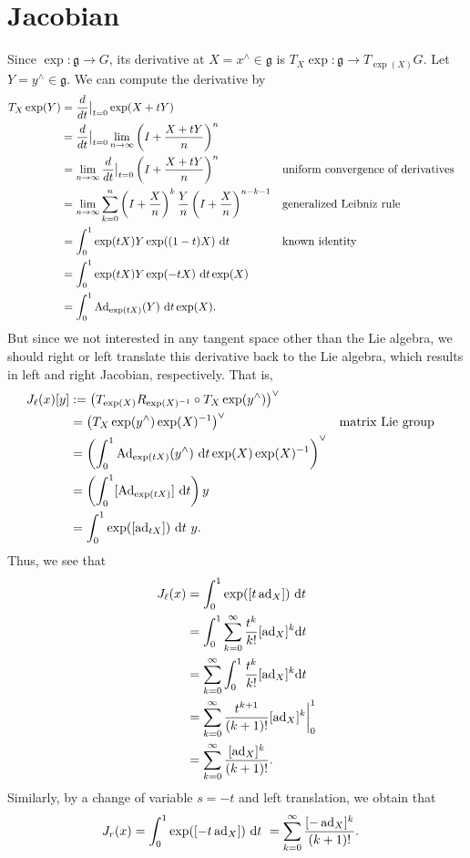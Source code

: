 \documentclass[12pt,class=article,crop=false]{standalone}
\begin{document}
\section{Jacobian}
Since $ \exp: \mathfrak{g} \to G $, its derivative at $ X= x^\wedge  \in \mathfrak{g} $ is $ T_X \exp: \mathfrak{g} \to T_{\exp(X)}G$. Let $ Y= y^\wedge  \in \mathfrak{g} $. We can compute the derivative by
\begin{align*}
	T_X \exp( Y) &= \frac{d}{dt}\big|_{t= 0} \exp( X+tY) \\ 
	&= \frac{d}{dt}\big|_{t= 0} \lim_{ n \to \infty} \left( I + \frac{X+tY}{ n} \right)^{n}  \\
	&= \lim_{ n \to \infty} \frac{d}{dt}\big|_{t= 0} \left( I + \frac{X+tY}{ n} \right)^{n}  && \text{uniform convergence of derivatives}  \\
	&= \lim_{ n \to \infty} \sum_{ k= 0}^{ n} \left( I+ \frac{X}{n} \right)^{k} \frac{Y}{n} \left( I+\frac{X}{n} \right)^{n-k-1}  && \text{generalized Leibniz rule}  \\
	&= \int_{ 0}^{ 1} \exp( tX) Y \exp( (1-t)X)\ \d t && \text{known identity}  \\
	&= \int_{ 0}^{ 1} \exp( tX) Y \exp( -tX)\ \d t \exp( X)  \\
	&= \int_{ 0}^{ 1} \Ad_{ \exp( tX)}( Y)\ \d t \exp( X)  .
\end{align*}
But since we not interested in any tangent space other than the Lie algebra, we should right or left translate this derivative back to the Lie algebra, which results in left and right Jacobian, respectively. That is,
\begin{align*}
	J_\ell(x)[y] &:= \left(T_{\exp(X)} R_{\exp(X)^{-1}} \circ  T_X \exp( y^\wedge ) \right)^\vee\\
		  &= \left( T_X \exp( y^\wedge ) \exp( X)^{-1}\right)^\vee && \text{matrix Lie group}   \\
		  &= \left(  \int_{ 0}^{ 1} \operatorname{Ad}_{ \exp( tX)}( y^\wedge )\ \mathrm{d} t \exp( X) \exp( X)^{-1} \right)^\vee  \\
	&= \left(\int_{ 0}^{ 1} [\operatorname{Ad}_{ \exp( tX)}]\ \mathrm{d} t  \right) y \\
	&= \int_{ 0}^{ 1} \exp( [ \operatorname{ad}_{t X}])\ \mathrm{d} t \ y .
\end{align*}
Thus, we see that
\begin{align*}
	J_{\ell}(x) &= \int_{ 0}^{ 1} \exp( [t \operatorname{ad}_{ X}])\ \mathrm{d} t  \\
		    &= \int_{ 0}^{ 1} \sum_{ k= 0}^{\infty}\frac{t^{k}}{k! }[ \operatorname{ad}_{ X}]^{k} \mathrm{d} t \\
		    &= \sum_{ k= 0}^{\infty} \int_{ 0}^{ 1} \frac{t^{k}}{ k!} [ \operatorname{ad}_{ X}]^{k} \mathrm{d} t \\
		    &= \sum_{ k= 0}^{\infty} \frac{t^{k+1}}{ (k+1)!} [ \operatorname{ad}_{ X}]^{k}\bigg|_0^1 \\
		    &= \sum_{ k= 0}^{\infty} \frac{[ \operatorname{ad}_{ X}]^{k}}{(k+1)!} .
\end{align*}
Similarly, by a change of variable $ s=-t$ and left translation, we obtain that
\begin{align*}
	J_r(x) &= \int_{ 0}^{ 1} \exp( [ -t\operatorname{ad}_{X}])\ \mathrm{d} t \ = \sum_{ k= 0}^{\infty} \frac{[- \operatorname{ad}_{ X}]^{k}}{(k+1)!}  .
\end{align*}
\end{document}
